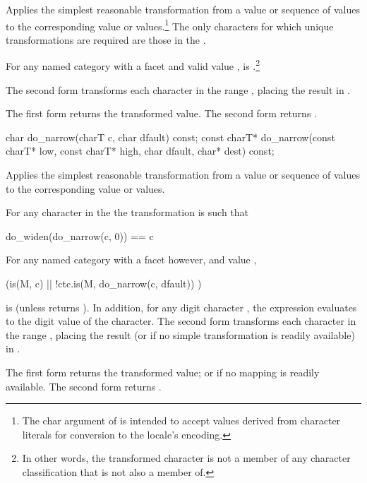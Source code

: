 \begin{itemdescr}
\pnum
\effects
Applies the simplest reasonable transformation from a
value or sequence of
values to the corresponding
value or values.\footnote{The char argument of
is intended to accept values derived from character literals for conversion
to the locale's encoding.}
The only characters for which unique transformations are required
are those in the .

For any named
category with a
facet  and valid
value ,
is
.\footnote{In other words, the transformed character is not a member
of any character classification that  is not also a member of.}

The second form transforms each character
in the range
,
placing the result in
.

\pnum
\returns
The first form returns the transformed value.
The second form returns .
\end{itemdescr}

%
\begin{itemdecl}
char         do_narrow(charT c, char dfault) const;
const charT* do_narrow(const charT* low, const charT* high, char dfault, char* dest) const;
\end{itemdecl}

\begin{itemdescr}
\pnum
\effects
Applies the simplest reasonable transformation from a
value or sequence of
values to the corresponding
value or values.

For any character  in the
the transformation is such that

\begin{codeblock}
do_widen(do_narrow(c, 0)) == c
\end{codeblock}

For any named
category with a
facet  however, and
value ,
\begin{codeblock}
(is(M, c) || !ctc.is(M, do_narrow(c, dfault)) )
\end{codeblock}
is
(unless
returns
).
In addition, for any digit character ,
the expression
evaluates to the digit value of the character.
The second form transforms each character
in the range
,
placing the result (or 
if no simple transformation is readily available) in
.

\pnum
\returns
The first form returns the transformed value; or 
if no mapping is readily available.
The second form returns .
\end{itemdescr}

